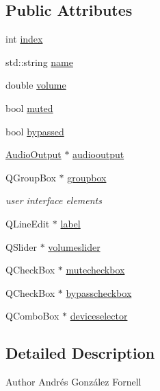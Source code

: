 \subsection*{Public Attributes}
\begin{DoxyCompactItemize}
\item 
int \hyperlink{class_channel_a992b8f195f395a64b4e966886bb41f00}{index}
\item 
std\+::string \hyperlink{class_channel_ae080e1afd52f3b70e04c62fea46447aa}{name}
\item 
double \hyperlink{class_channel_aa8977e4605932b2201b03ebf3aa14ffd}{volume}
\item 
bool \hyperlink{class_channel_ada7e3a050c346ad283ad302745f03f3c}{muted}
\item 
bool \hyperlink{class_channel_a94507945240717f2570e3baadd02d08a}{bypassed}
\item 
\hyperlink{class_audio_output}{Audio\+Output} $\ast$ \hyperlink{class_channel_a7c8a0b25848ab487c39a803785f7ed21}{audiooutput}
\end{DoxyCompactItemize}
\textbf{ }\par
\begin{DoxyCompactItemize}
\item 
Q\+Group\+Box $\ast$ \hyperlink{class_channel_a99287738754d9e20c0ca639d6d26f28c}{groupbox}
\begin{DoxyCompactList}\small\item\em user interface elements \end{DoxyCompactList}\item 
Q\+Line\+Edit $\ast$ \hyperlink{class_channel_a66a7e30d0b8c6ee9c0b0d537b59bd695}{label}
\item 
Q\+Slider $\ast$ \hyperlink{class_channel_acbcbfb33558a69224daa176372eb8be3}{volumeslider}
\item 
Q\+Check\+Box $\ast$ \hyperlink{class_channel_a0e7f90da49f291a7bac498e11e886fbd}{mutecheckbox}
\item 
Q\+Check\+Box $\ast$ \hyperlink{class_channel_a285eab1752d5e9407e1bc1e75353df34}{bypasscheckbox}
\item 
Q\+Combo\+Box $\ast$ \hyperlink{class_channel_a9dcb50dc41866fbe60424553f1b910fa}{deviceselector}
\end{DoxyCompactItemize}



\subsection{Detailed Description}
\begin{DoxyAuthor}{Author}
Andrés González Fornell 
\end{DoxyAuthor}


